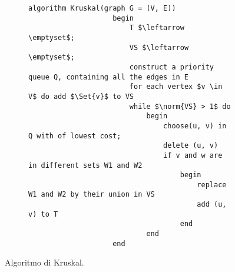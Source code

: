 \documentclass{subfiles}
\begin{document}
\begin{figure}[!h]
    \centering
    \begin{subfigure}[b]{0.85\textwidth}
        \begin{lstlisting}[language = algol]
                algorithm Kruskal(graph G = (V, E))
                    begin
                        T $\leftarrow \emptyset$;
                        VS $\leftarrow \emptyset$;
                        construct a priority queue Q, containing all the edges in E
                        for each vertex $v \in V$ do add $\Set{v}$ to VS
                        while $\norm{VS} > 1$ do
                            begin
                                choose(u, v) in Q with of lowest cost;
                                delete (u, v)
                                if v and w are in different sets W1 and W2
                                    begin
                                        replace W1 and W2 by their union in VS
                                        add (u, v) to T
                                    end
                            end
                    end
            \end{lstlisting}
    \end{subfigure}
    \caption{Algoritmo di Kruskal.}
    \label{Fig:6.1}
\end{figure}
\end{document}
